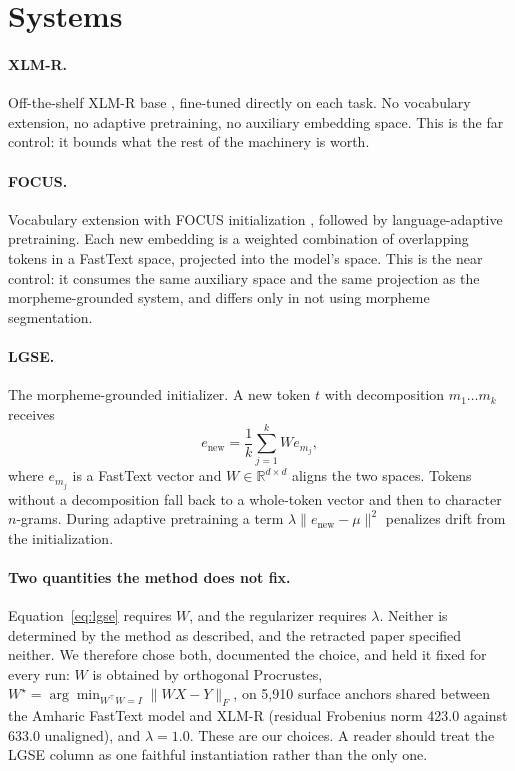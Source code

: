 \documentclass[11pt]{article}
\begin{document}
\section{Systems}

\paragraph{XLM-R.} Off-the-shelf XLM-R base
\citep{conneau-etal-2020-unsupervised}, fine-tuned directly on each task. No
vocabulary extension, no adaptive pretraining, no auxiliary embedding space.
This is the far control: it bounds what the rest of the machinery is worth.

\paragraph{FOCUS.} Vocabulary extension with FOCUS initialization
\citep{dobler-de-melo-2023-focus}, followed by language-adaptive pretraining.
Each new embedding is a weighted combination of overlapping tokens in a
FastText space, projected into the model's space. This is the near control:
it consumes the same auxiliary space and the same projection as the
morpheme-grounded system, and differs only in not using morpheme
segmentation.

\paragraph{LGSE.} The morpheme-grounded initializer. A new token $t$ with
decomposition $m_1 \dots m_k$ receives
\begin{equation}
e_{\text{new}} = \frac{1}{k}\sum_{j=1}^{k} W e_{m_j},
\label{eq:lgse}
\end{equation}
where $e_{m_j}$ is a FastText vector and $W \in \mathbb{R}^{d \times d}$
aligns the two spaces. Tokens without a decomposition fall back to a
whole-token vector and then to character $n$-grams. During adaptive
pretraining a term $\lambda \lVert e_{\text{new}} - \mu \rVert^2$ penalizes
drift from the initialization.

\paragraph{Two quantities the method does not fix.} Equation~\ref{eq:lgse}
requires $W$, and the regularizer requires $\lambda$. Neither is determined
by the method as described, and the retracted paper specified neither. We
therefore chose both, documented the choice, and held it fixed for every
run: $W$ is obtained by orthogonal Procrustes,
$W^\star = \arg\min_{W^\top W = I}\lVert WX - Y\rVert_F$, on 5{,}910 surface
anchors shared between the Amharic FastText model and XLM-R (residual
Frobenius norm 423.0 against 633.0 unaligned), and $\lambda = 1.0$. These are
our choices. A reader should treat the LGSE column as one faithful
instantiation rather than the only one.
\end{document}

